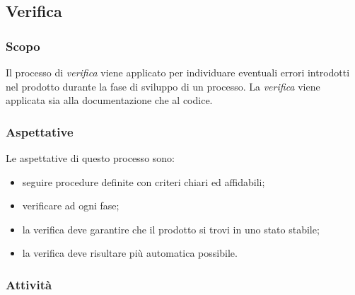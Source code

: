 	
		\subsection{Verifica}
			\subsubsection{Scopo}
				Il processo di \emph{verifica} viene applicato per individuare eventuali errori introdotti nel prodotto durante la fase di sviluppo di un processo. La \emph{verifica} viene applicata sia alla documentazione che al codice. %
			\subsubsection{Aspettative}
				Le aspettative di questo processo sono:
					\begin{itemize}
						\item seguire procedure definite con criteri chiari ed affidabili;
						\item verificare ad ogni fase;
						\item la verifica deve garantire che il prodotto si trovi in uno stato stabile;
						\item la verifica deve risultare più automatica possibile.
					\end{itemize}
				
			\subsubsection{Attività}
